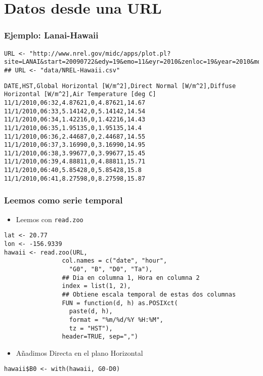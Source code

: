 \documentclass{beamer}
\begin{document}
\section{Datos desde una URL}
\label{sec-5}
\begin{frame}[fragile]
\frametitle{Ejemplo: Lanai-Hawaii}
\label{sec-5-1}



\lstset{language=R}
\begin{lstlisting}
URL <- "http://www.nrel.gov/midc/apps/plot.pl?site=LANAI&start=20090722&edy=19&emo=11&eyr=2010&zenloc=19&year=2010&month=11&day=1&endyear=2010&endmonth=11&endday=19&time=1&inst=3&inst=4&inst=5&inst=10&type=data&first=3&math=0&second=-1&value=0.0&global=-1&direct=-1&diffuse=-1&user=0&axis=1"
## URL <- "data/NREL-Hawaii.csv"
\end{lstlisting}


\begin{verbatim}
DATE,HST,Global Horizontal [W/m^2],Direct Normal [W/m^2],Diffuse Horizontal [W/m^2],Air Temperature [deg C]
11/1/2010,06:32,4.87621,0,4.87621,14.67
11/1/2010,06:33,5.14142,0,5.14142,14.54
11/1/2010,06:34,1.42216,0,1.42216,14.43
11/1/2010,06:35,1.95135,0,1.95135,14.4
11/1/2010,06:36,2.44687,0,2.44687,14.55
11/1/2010,06:37,3.16990,0,3.16990,14.95
11/1/2010,06:38,3.99677,0,3.99677,15.45
11/1/2010,06:39,4.88811,0,4.88811,15.71
11/1/2010,06:40,5.85428,0,5.85428,15.8
11/1/2010,06:41,8.27598,0,8.27598,15.87
\end{verbatim}
\end{frame}
\begin{frame}[fragile]
\frametitle{Leemos como serie temporal}
\label{sec-5-2}

\begin{itemize}
\item Leemos con \texttt{read.zoo}
\end{itemize}

\lstset{language=R}
\begin{lstlisting}
lat <- 20.77
lon <- -156.9339
hawaii <- read.zoo(URL,
                col.names = c("date", "hour",
                  "G0", "B", "D0", "Ta"),
                ## Dia en columna 1, Hora en columna 2
                index = list(1, 2),
                ## Obtiene escala temporal de estas dos columnas
                FUN = function(d, h) as.POSIXct(
                  paste(d, h),
                  format = "%m/%d/%Y %H:%M",
                  tz = "HST"), 
                header=TRUE, sep=",")
\end{lstlisting}
\begin{itemize}
\item Añadimos Directa en el plano Horizontal
\end{itemize}

\lstset{language=R}
\begin{lstlisting}
hawaii$B0 <- with(hawaii, G0-D0)
\end{lstlisting}
\end{frame}
\end{document}
